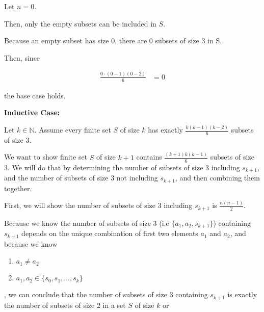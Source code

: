 \documentclass[12pt]{article}
\begin{document}
\begin{itemize}
\begin{mdframed}
        \bigskip

        Let $n = 0$.

        \bigskip

        Then, only the empty subsets can be included in $S$.

        \bigskip

        Because an empty subset has size 0, there are 0 subsets of size 3 in S.

        \bigskip

        Then, since

        \begin{align}
            \frac{0 \cdot (0-1)(0-2)}{6} &= 0
        \end{align}

        the base case holds.

        \bigskip

        \textbf{Inductive Case:}

        \bigskip

        Let $k \in \mathbb{N}$. Assume every finite set $S$ of size $k$ has exactly
        $\frac{k(k-1)(k-2)}{6}$ subsets of size 3.

        \bigskip

        \color{red}
        We want to show finite set $S$ of size $k+1$ contains $\frac{(k+1)k(k-1)}{6}$
        subsets of size 3. We will do that by determining the number of subsets of size
        3 including $s_{k+1}$, and the number of subsets of size 3 not including $s_{k+1}$,
        and then combining them together.

        \bigskip

        First, we will show the number of subsets of size 3 including $s_{k+1}$
        is $\frac{n(n-1)}{2}$.

        \bigskip

        Because we know the number of subsets of size 3 (i.e $\{a_1,a_2,s_{k+1}\}$)
        containing $s_{k+1}$ depends on the unique combination of first two elements $a_1$ and $a_2$,
        and because we know

        \begin{enumerate}[1.]
            \item $a_1 \neq a_2$
            \item $a_1,a_2 \in \{s_0,s_1,\dots,s_k\}$
        \end{enumerate}

        , we can conclude that the number of subsets of size 3 containing $s_{k+1}$
        is exactly the number of subsets of size 2 in a set $S$ of size $k$ or


\end{mdframed}
\end{itemize}
\end{document}
